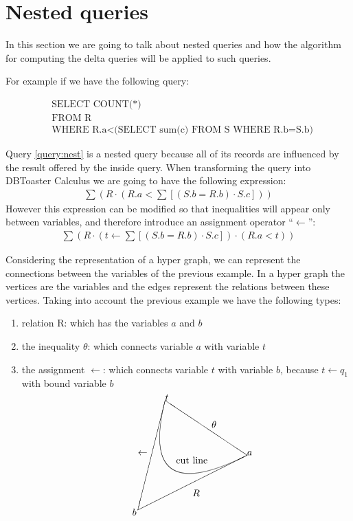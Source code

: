 \documentclass[12pt]{article}
\begin{document}
\section{Nested queries}

In this section we are going to talk about nested queries and how the algorithm for computing the delta queries will be applied to such queries. 

For example if we have the following query:

\begin{align}
\label{query:nest}
&\mbox{SELECT COUNT(*) }\\
&\mbox{FROM R}\nonumber\\
&\mbox{WHERE R.a}<\mbox{(SELECT sum(c) FROM S WHERE R.b=S.b)}\nonumber
\end{align}

Query \ref{query:nest} is a nested query because all of its records are influenced by the result offered by the inside query. When transforming the query into DBToaster Calculus we are going to have the following expression:
\begin{align}
\sum(R\cdot(R.a<\sum[(S.b=R.b)\cdot S.c]))
\end{align}
However this expression can be modified so that inequalities will appear only between variables, and therefore introduce an assignment operator ``$\gets$'':
\begin{align}
\label{form}\sum(R\cdot(t\gets\sum[(S.b=R.b)\cdot S.c])\cdot(R.a<t))
\end{align}

Considering the representation of a hyper graph, we can represent the connections between the variables of the previous example. In a hyper graph the vertices are the variables and the edges represent the relations between these vertices. Taking into account the previous example we have the following types:
\begin{enumerate}
\item relation R: which has the variables $a$ and $b$
\item the inequality $\theta$: which connects variable $a$ with variable $t$
\item the assignment $\gets$: which connects variable $t$ with variable $b$, because $t\gets q_{1}$ with bound variable $b$
\end{enumerate}
\begin{align}
\label{hyper}
\setlength{\unitlength}{1mm}
\begin{picture}(50,50)
\put(50,30){\line(-3,2){30}}
\put(20,50){\line(-1,-4){10}}
\put(10,10){\line(2,1){40}}
\qbezier(50,30)(10,10)(20,50)
\put(50,30){$a$}
\put(20,50){$t$}
\put(8,8){$b$}
\put(30,15){$R$}
\put(37,40){$\theta$}
\put(10,30){$\gets$}
\put(24,27){\mbox{cut line}}
\end{picture}
\end{align}
\end{document}
